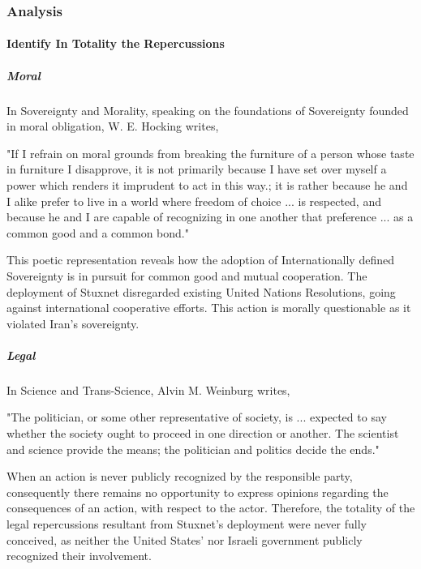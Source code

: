 \documentclass[12pt]{article}
\begin{document}
\begin{multicols}{2}
\subsubsection{Analysis}

\paragraph{Identify In Totality the Repercussions}

\subparagraph{Moral}

In Sovereignty and Morality, speaking on the foundations of Sovereignty founded in moral obligation, W. E. Hocking writes,

\begin{displayquote}
"If I refrain on moral grounds from breaking the furniture of a person whose taste in furniture I disapprove, it is not primarily because I have set over myself a power which renders it imprudent to act in this way.; it is rather because he and I alike prefer to live in a world where freedom of choice ... is respected, and because he and I are capable of recognizing in one another that preference ... as a common good and a common bond."\cite{soverigntyAndMoralObligation}
\end{displayquote}

This poetic representation reveals how the adoption of Internationally defined Sovereignty is in pursuit for common good and mutual cooperation. The deployment of Stuxnet disregarded existing United Nations Resolutions, going against international cooperative efforts.\cite{resolution1747} This action is morally questionable as it violated Iran's sovereignty.

\subparagraph{Legal}

In Science and Trans-Science, Alvin M. Weinburg writes,

\begin{displayquote}
"The politician, or some other representative of society, is ... expected to say whether the society ought to proceed in one direction or another. The scientist and science provide the means; the politician and politics decide the ends."\cite{scienceAndTransScience}
\end{displayquote}

When an action is never publicly recognized by the responsible party, consequently there remains no opportunity to express opinions regarding the consequences of an action, with respect to the actor. Therefore, the totality of the legal repercussions resultant from Stuxnet's deployment were never fully conceived, as neither the United States' nor Israeli government publicly recognized their involvement.


\end{multicols}
\end{document}
